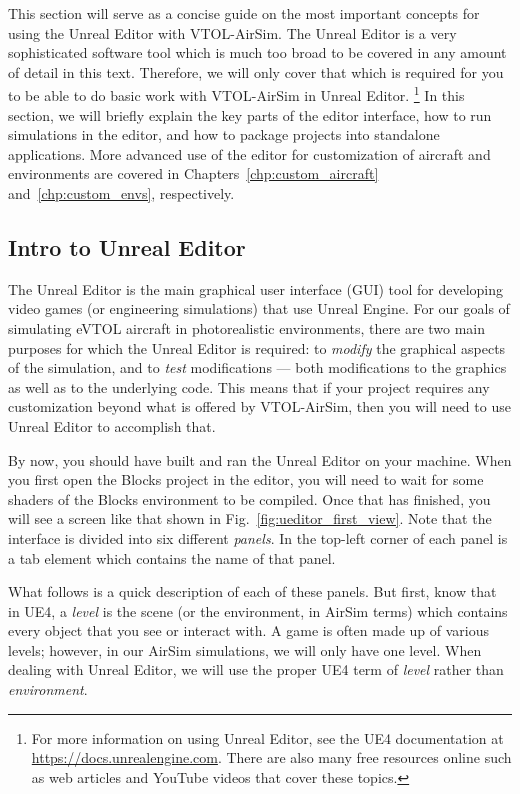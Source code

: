 This section will serve as a concise guide on the most important concepts for using the Unreal Editor with VTOL-AirSim. The Unreal Editor is a very sophisticated software tool which is much too broad to be covered in any amount of detail in this text. Therefore, we will only cover that which is required for you to be able to do basic work with VTOL-AirSim in Unreal Editor.%
\footnote{For more information on using Unreal Editor, see the UE4 documentation at \url{https://docs.unrealengine.com}. There are also many free resources online such as web articles and YouTube videos that cover these topics.} %
In this section, we will briefly explain the key parts of the editor interface, how to run simulations in the editor, and how to package projects into standalone applications. More advanced use of the editor for customization of aircraft and environments are covered in Chapters~\ref{chp:custom_aircraft} and~\ref{chp:custom_envs}, respectively.

\subsection{Intro to Unreal Editor}
The Unreal Editor is the main graphical user interface (GUI) tool for developing video games (or engineering simulations) that use Unreal Engine. For our goals of simulating eVTOL aircraft in photorealistic environments, there are two main purposes for which the Unreal Editor is required: to \textit{modify} the graphical aspects of the simulation, and to \textit{test} modifications --- both modifications to the graphics as well as to the underlying \CC code. This means that if your project requires any customization beyond what is offered by VTOL-AirSim, then you will need to use Unreal Editor to accomplish that.

By now, you should have built and ran the Unreal Editor on your machine. When you first open the Blocks project in the editor, you will need to wait for some shaders of the Blocks environment to be compiled. Once that has finished, you will see a screen like that shown in Fig.~\ref{fig:ueditor_first_view}. Note that the interface is divided into six different \textit{panels}. In the top-left corner of each panel is a tab element which contains the name of that panel.

What follows is a quick description of each of these panels. But first, know that in UE4, a \textit{level} is the scene (or the environment, in AirSim terms) which contains every object that you see or interact with. A game is often made up of various levels; however, in our AirSim simulations, we will only have one level. When dealing with Unreal Editor, we will use the proper UE4 term of \textit{level} rather than \textit{environment}.

